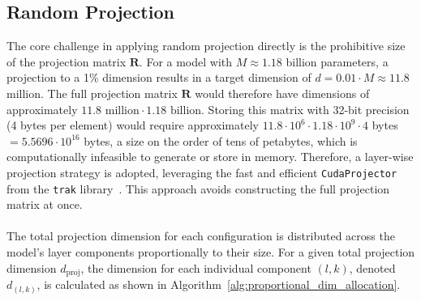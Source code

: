 \subsection{Random Projection}
The core challenge in applying random projection directly is the prohibitive size of the projection matrix $\mathbf{R}$. For a model with $M \approx 1.18$ billion parameters, a projection to a 1\% dimension results in a target dimension of $d = 0.01 \cdot M \approx 11.8$ million. The full projection matrix $\mathbf{R}$ would therefore have dimensions of approximately $11.8 \text{ million} \cdot 1.18 \text{ billion}$. Storing this matrix with 32-bit precision (4 bytes per element) would require approximately $11.8 \cdot 10^6 \cdot 1.18 \cdot 10^9 \cdot 4$ bytes $= 5.5696 \cdot 10^{16}$ bytes, a size on the order of tens of petabytes, which is computationally infeasible to generate or store in memory. Therefore, a layer-wise projection strategy is adopted, leveraging the fast and efficient \texttt{CudaProjector} from the \texttt{trak} library~\cite{DBLP:conf/icml/ParkGILM23}. This approach avoids constructing the full projection matrix at once.
\\\\
The total projection dimension for each configuration is distributed across the model's layer components proportionally to their size. For a given total projection dimension $d_\text{proj}$, the dimension for each individual component $(l,k)$, denoted $d_{(l,k)}$, is calculated as shown in Algorithm~\ref{alg:proportional_dim_allocation}.
\begin{algorithm}[ht]
\caption{Proportional Allocation of Projection Dimensions to Layer Components}
\label{alg:proportional_dim_allocation}
\DontPrintSemicolon

\end{algorithm}
